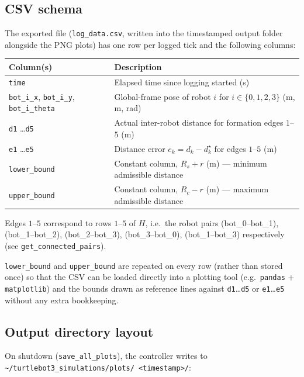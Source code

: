 \documentclass[11pt]{article}
\begin{document}
\subsection{CSV schema}

The exported file (\texttt{log\_data.csv}, written into the timestamped
output folder alongside the PNG plots) has one row per logged tick and the
following columns:

\begin{center}
\begin{tabular}{@{}l l@{}}
\toprule
\textbf{Column(s)} & \textbf{Description} \\
\midrule
\texttt{time} & Elapsed time since logging started (s) \\
\texttt{bot\_i\_x}, \texttt{bot\_i\_y}, \texttt{bot\_i\_theta} &
    Global-frame pose of robot $i$ for $i \in \{0,1,2,3\}$ (m, m, rad) \\
\texttt{d1} \dots \texttt{d5} &
    Actual inter-robot distance for formation edges $1$--$5$ (m) \\
\texttt{e1} \dots \texttt{e5} &
    Distance error $e_k = d_k - d_k^\star$ for edges $1$--$5$ (m) \\
\texttt{lower\_bound} &
    Constant column, $R_s + r$ (m) --- minimum admissible distance \\
\texttt{upper\_bound} &
    Constant column, $R_c - r$ (m) --- maximum admissible distance \\
\bottomrule
\end{tabular}
\end{center}

Edges $1$--$5$ correspond to rows $1$--$5$ of $H$, i.e.\ the robot pairs
(bot\_0--bot\_1), (bot\_1--bot\_2), (bot\_2--bot\_3), (bot\_3--bot\_0),
(bot\_1--bot\_3) respectively (see \texttt{get\_connected\_pairs}).

\texttt{lower\_bound} and \texttt{upper\_bound} are repeated on every row
(rather than stored once) so that the CSV can be loaded directly into a
plotting tool (e.g.\ \texttt{pandas} + \texttt{matplotlib}) and the bounds
drawn as reference lines against \texttt{d1}\dots\texttt{d5} or
\texttt{e1}\dots\texttt{e5} without any extra bookkeeping.

\subsection{Output directory layout}

On shutdown (\texttt{save\_all\_plots}), the controller writes to
\texttt{\textasciitilde/turtlebot3\_simulations/plots/\allowbreak
<timestamp>/}:
\end{document}

